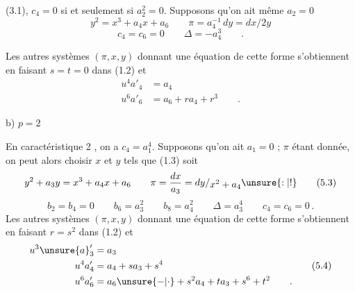 (3.1), $c_4=0$ si et seulement si $a_2^2=0$. Supposons qu'on ait même $a_2=0$
\[
y^2=x^3+a_4x+a_6\qquad \pi=a_4^{-1}\,dy=dx/2y\tag*{(5.1)}
\]
\[
c_4=c_6=0\qquad \Delta=-a_4^3\qquad .
\]

Les autres systèmes $(\pi,x,y)$ donnant une équation de cette forme s'obtiennent en faisant $s=t=0$ dans (1.2) et
\[
\begin{aligned}
u^4a'_4&=a_4\\
u^6a'_6&=a_6+ra_4+r^3\qquad .
\end{aligned}\tag*{(5.2)}
\]

b) $p=2$

En caractéristique 2 , on a $c_4=a_1^4$. Supposons qu'on ait $a_1=0$ ; $\pi$ étant donnée, on peut alors choisir $x$ et $y$ tels que (1.3) soit
\[
y^2+a_3y=x^3+a_4x+a_6\qquad\pi=\frac{dx}{a_3}=dy/\raisebox{-.45ex}{$x^2+a_4$}\unsure{:|!}\tag*{(5.3)}
\]
\[
b_2=b_4=0\qquad b_6=a_3^2\qquad b_8=a_4^2\qquad\Delta=a_3^4\qquad c_4=c_6=0\, .
\]
Les autres systèmes $(\pi,x,y)$ donnant une équation de cette forme s'obtiennent en faisant $r=s^2$ dans (1.2) et
\[
\begin{aligned}
u^3\unsure{a}'_3&=a_3\\
u^4a'_4&=a_4+sa_3+s^4\\
u^6a'_6&=a_6\unsure{-|\cdot}+s^2a_4+ta_3+s^6+t^2\qquad .
\end{aligned}\tag*{(5.4)}
\]

